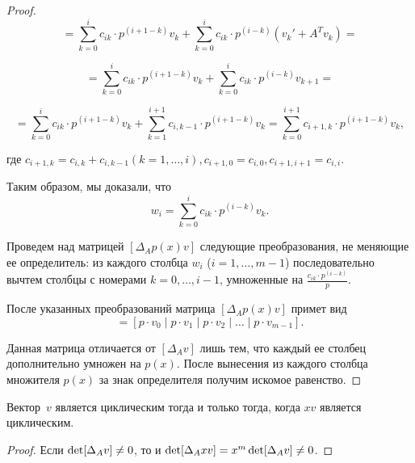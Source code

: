 \begin{proof}
\begin{equation*}
    = \sum\limits_{k = 0}^i c_{ik} \cdot p^{(i + 1 - k)} v_k +
    \sum\limits_{k = 0}^i c_{ik} \cdot p^{(i - k)} (v_k' + A^T v_k) =
\end{equation*}

\begin{equation*}
    = \sum\limits_{k = 0}^i c_{ik} \cdot p^{(i + 1 - k)} v_k +
    \sum\limits_{k = 0}^i c_{ik} \cdot p^{(i - k)} v_{k+1} =
\end{equation*}

\begin{equation*}
    = \sum\limits_{k = 0}^i c_{ik} \cdot p^{(i + 1 - k)} v_k +
    \sum\limits_{k = 1}^{i + 1} c_{i,k-1} \cdot p^{(i + 1 - k)} v_{k} =
    \sum\limits_{k = 0}^{i + 1} c_{i + 1,k} \cdot p^{(i + 1 - k)} v_k,
\end{equation*}

где $c_{i + 1,k} = c_{i,k} + c_{i,k - 1} (k = 1, \dots, i), c_{i+1,0} = c_{i,0}, c_{i+1,i+1} = c_{i,i}$.

Таким образом, мы доказали, что
\begin{equation*}
    w_i = \sum\limits_{k = 0}^i c_{ik} \cdot p^{(i - k)} v_k.
\end{equation*}

Проведем над матрицей $[\Delta_A p(x)v]$ следующие преобразования, не меняющие ее определитель:
из каждого столбца $w_{i}$ ($i = 1, \dots, m - 1$) последовательно вычтем столбцы с номерами $k = 0, \dots, i - 1$,
умноженные на $\frac{c_{ik} \cdot p^{(i - k)}}{p}$.

После указанных преобразований матрица $[\Delta_A p(x)v]$ примет вид
\begin{equation*}
    [\Delta_A p(x)v] = [p \cdot v_0 \mid p \cdot v_1 \mid p \cdot v_2 \mid \dots \mid p \cdot v_{m-1}].
\end{equation*}

Данная матрица отличается от $[\Delta_A v]$ лишь тем, что каждый ее столбец дополнительно умножен на $p(x)$.
После вынесения из каждого столбца множителя $p(x)$ за знак определителя получим искомое равенство.

\end{proof}

\begin{consequence}
Вектор~$v$ является циклическим тогда и только тогда, когда $x v$ является циклическим.
\end{consequence}

\begin{proof}
Если $\mathop{\rm det}[\Delta_A v] \neq 0$, то и $\mathop{\rm det}[\Delta_A xv] = x^{m}\mathop{\rm det}[\Delta_A v] \neq 0$.
\end{proof}